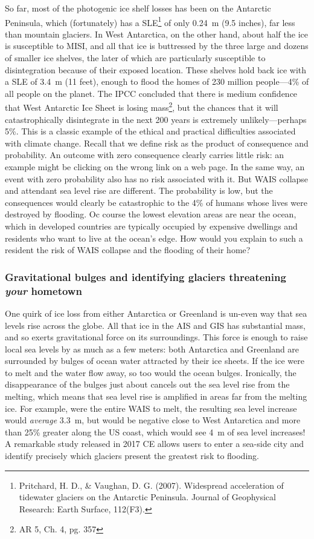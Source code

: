 \documentclass[amstex,12pt]{book}
\begin{document}
So far, most of the photogenic ice shelf losses has been on the Antarctic Peninsula, which (fortunately) has a SLE\footnote{Pritchard, H. D., \& Vaughan, D. G. (2007). Widespread acceleration of tidewater glaciers on the Antarctic Peninsula. Journal of Geophysical Research: Earth Surface, 112(F3).} of only \SI{0.24}{\metre} (9.5 inches), far less than mountain glaciers. In West Antarctica, on the other hand,  about half the ice is susceptible to MISI, and all that ice is buttressed by the three large and dozens of smaller ice shelves, the later of which are particularly susceptible to disintegration because of their exposed location. These shelves hold back ice with a SLE of \SI{3.4}{\metre} (11 feet), enough to flood the homes of 230 million people---4\% of all people on the planet. The IPCC concluded that there is medium confidence that West Antarctic Ice Sheet is losing mass\footnote{AR 5, Ch. 4, pg. 357}, but the chances that it will catastrophically disintegrate in the next 200 years is extremely unlikely---perhaps 5\%. This is a classic example of the ethical and practical difficulties associated with climate change. Recall that we define risk as the product of consequence and probability. An outcome with zero consequence clearly carries little risk: an example might be clicking on the wrong link on a web page. In the same way, an event with zero probability also has no risk associated with it. But WAIS collapse and attendant sea level rise are different. The probability is low, but the consequences would clearly be catastrophic to the 4\% of humans whose lives were destroyed by flooding. Oc course the lowest elevation areas are near the ocean, which in developed countries are typically occupied by expensive dwellings and residents who want to live at the ocean's edge. How would you explain to such a resident the risk of WAIS collapse and the flooding of their home?\\
\subsubsection{Gravitational bulges and identifying glaciers threatening \emph{your} hometown} One quirk of ice loss from either Antarctica or Greenland is un-even way that sea levels rise across the globe. All that ice in the AIS and GIS has substantial mass, and so exerts gravitational force on its surroundings. This force is enough to raise local sea levels by as much as a few meters: both Antarctica and Greenland are surrounded by bulges of ocean water attracted by their ice sheets. If the ice were to melt and the water flow away, so too would the ocean bulges. Ironically, the disappearance of the bulges just about cancels out the  sea level rise from the melting, which means that sea level rise is amplified in areas far from the melting ice. For example, were the entire WAIS to melt, the resulting sea level increase would \emph{average} \SI{3.3}{\metre}, but would be negative close to West Antarctica and more than 25\% greater along the US coast, which would see \SI{4}{\metre} of sea level increases! A remarkable study released in 2017 CE allows users to enter a sea-side city and identify precisely which glaciers present the greatest risk to flooding. 
      
\end{document}
